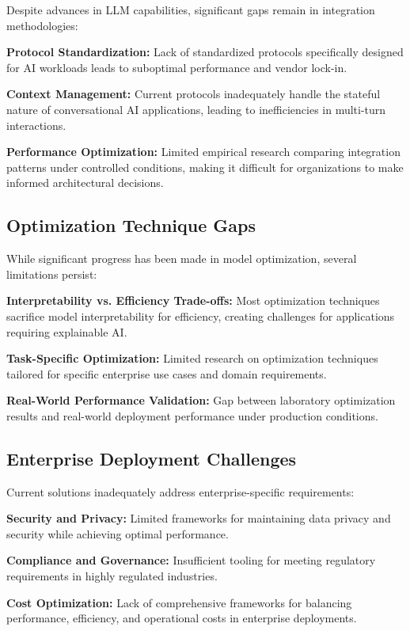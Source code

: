 Despite advances in LLM capabilities, significant gaps remain in integration methodologies:

\textbf{Protocol Standardization:} Lack of standardized protocols specifically designed for AI workloads leads to suboptimal performance and vendor lock-in.

\textbf{Context Management:} Current protocols inadequately handle the stateful nature of conversational AI applications, leading to inefficiencies in multi-turn interactions.

\textbf{Performance Optimization:} Limited empirical research comparing integration patterns under controlled conditions, making it difficult for organizations to make informed architectural decisions.

\subsection{Optimization Technique Gaps}

While significant progress has been made in model optimization, several limitations persist:

\textbf{Interpretability vs. Efficiency Trade-offs:} Most optimization techniques sacrifice model interpretability for efficiency, creating challenges for applications requiring explainable AI.

\textbf{Task-Specific Optimization:} Limited research on optimization techniques tailored for specific enterprise use cases and domain requirements.

\textbf{Real-World Performance Validation:} Gap between laboratory optimization results and real-world deployment performance under production conditions.

\subsection{Enterprise Deployment Challenges}

Current solutions inadequately address enterprise-specific requirements:

\textbf{Security and Privacy:} Limited frameworks for maintaining data privacy and security while achieving optimal performance.

\textbf{Compliance and Governance:} Insufficient tooling for meeting regulatory requirements in highly regulated industries.

\textbf{Cost Optimization:} Lack of comprehensive frameworks for balancing performance, efficiency, and operational costs in enterprise deployments.

